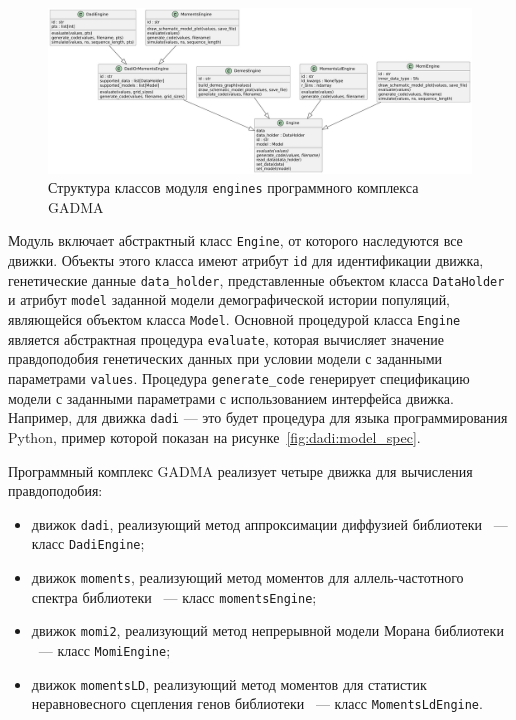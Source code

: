\begin{figure}[ht]
    \centering
    \includegraphics[width=\linewidth]{images/part5/engine_classes.pdf}
    \caption{Структура классов модуля \texttt{engines} программного комплекса GADMA}
    \label{fig:part5:engines_classes}
\end{figure}

Модуль включает абстрактный класс \texttt{Engine}, от которого наследуются все движки.
Объекты этого класса имеют атрибут \texttt{id} для идентификации движка, генетические данные \texttt{data\_holder}, представленные объектом класса \texttt{DataHolder} и атрибут \texttt{model} заданной модели демографической истории популяций, являющейся объектом класса \texttt{Model}.
Основной процедурой класса \texttt{Engine} является абстрактная процедура \texttt{evaluate}, которая вычисляет значение правдоподобия генетических данных при условии модели с заданными параметрами \texttt{values}.
Процедура \texttt{generate\_code} генерирует спецификацию модели с заданными параметрами с использованием интерфейса движка.
Например, для движка \texttt{dadi} --- это будет процедура для языка программирования Python, пример которой показан на рисунке~\ref{fig:dadi:model_spec}.

Программный комплекс GADMA реализует четыре движка для вычисления правдоподобия:
\begin{itemize}
    \item движок \texttt{dadi}, реализующий метод аппроксимации диффузией библиотеки \dadi~--- класс \texttt{DadiEngine};
    \item движок \texttt{moments}, реализующий метод моментов для аллель-частотного спектра библиотеки \moments~--- класс \texttt{momentsEngine};
    \item движок \texttt{momi2}, реализующий метод непрерывной модели Морана библиотеки \momi~--- класс \texttt{MomiEngine};
    \item движок \texttt{momentsLD}, реализующий метод моментов для статистик неравновесного сцепления генов библиотеки \momentsLD~--- класс \texttt{MomentsLdEngine}.
\end{itemize}

